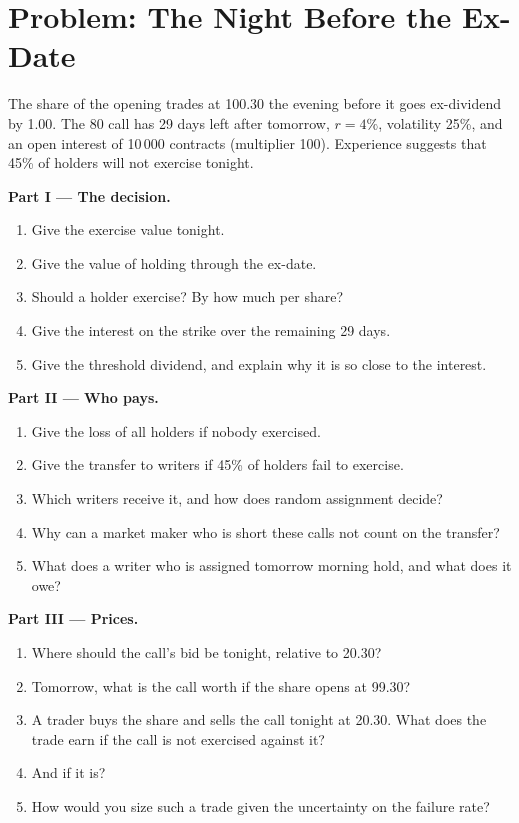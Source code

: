 \section{Problem: The Night Before the Ex-Date}

\begin{problem}\label{pb:dv:american-options-and-early-exercise:1}
The share of the opening trades at 100.30 the evening before it goes ex-dividend by 1.00.
The 80 call has 29 days left after tomorrow, $r=4\%$, volatility 25\%, and an open interest
of 10\,000 contracts (multiplier 100). Experience suggests that 45\% of holders will not
exercise tonight.

\medskip\noindent\textbf{Part I --- The decision.}
\begin{enumerate}
\item Give the exercise value tonight.
\item Give the value of holding through the ex-date.
\item Should a holder exercise? By how much per share?
\item Give the interest on the strike over the remaining 29 days.
\item Give the threshold dividend, and explain why it is so close to the interest.
\end{enumerate}

\medskip\noindent\textbf{Part II --- Who pays.}
\begin{enumerate}[resume]
\item Give the loss of all holders if nobody exercised.
\item Give the transfer to writers if 45\% of holders fail to exercise.
\item Which writers receive it, and how does random assignment decide?
\item Why can a market maker who is short these calls not count on the transfer?
\item What does a writer who is assigned tomorrow morning hold, and what does it owe?
\end{enumerate}

\medskip\noindent\textbf{Part III --- Prices.}
\begin{enumerate}[resume]
\item Where should the call's bid be tonight, relative to 20.30?
\item Tomorrow, what is the call worth if the share opens at 99.30?
\item A trader buys the share and sells the call tonight at 20.30. What does the trade earn
if the call is not exercised against it?
\item And if it is?
\item How would you size such a trade given the uncertainty on the failure rate?
\end{enumerate}


\end{problem}
